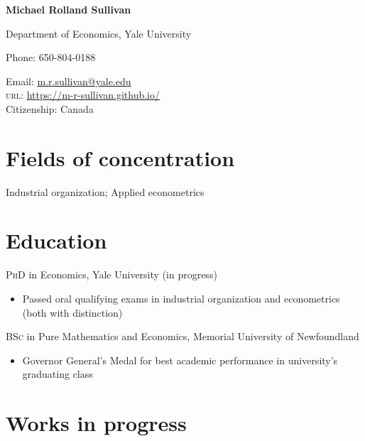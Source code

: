 \documentclass[11pt]{article} %
\begin{document}

{\LARGE\bfseries Michael Rolland Sullivan} %
\bigskip\bigskip\medskip %

Department of Economics, Yale University\\ %
\medskip %

Phone: 650-804-0188\\ %
\medskip %

Email: \href{mailto:m.r.sullivan@yale.edu}{m.r.sullivan@yale.edu}\\ %
\textsc{url}: \href{https://m-r-sullivan.github.io/}{https://m-r-sullivan.github.io/}\\ %

Citizenship: Canada 

\section*{Fields of concentration}

Industrial organization; Applied econometrics %

\section*{Education}

\textsc{PhD} in Economics, Yale University (in progress)
\begin{itemize}
	\item Passed oral qualifying exams in industrial organization and econometrics (both with distinction)
\end{itemize}

\textsc{BSc} in Pure Mathematics and Economics, Memorial University of Newfoundland
\begin{itemize}
	\item Governor General's Medal for best academic performance in university's graduating class
\end{itemize}

\section*{Works in progress}
\end{document}
